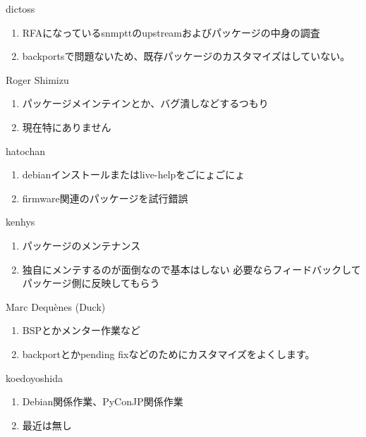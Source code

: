 \begin{prework}{ dictoss }
  \begin{enumerate}
  \item RFAになっているsnmpttのupstreamおよびパッケージの中身の調査
  \item backportsで問題ないため、既存パッケージのカスタマイズはしていない。
  \end{enumerate}
\end{prework}

\begin{prework}{ Roger Shimizu }
  \begin{enumerate}
  \item パッケージメインテインとか、バグ潰しなどするつもり
  \item 現在特にありません
  \end{enumerate}
\end{prework}

\begin{prework}{ hatochan }
  \begin{enumerate}
  \item debianインストールまたはlive-helpをごにょごにょ
  \item firmware関連のパッケージを試行錯誤
  \end{enumerate}
\end{prework}

\begin{prework}{ kenhys }
  \begin{enumerate}
  \item パッケージのメンテナンス
  \item 独自にメンテするのが面倒なので基本はしない 必要ならフィードバックしてパッケージ側に反映してもらう
  \end{enumerate}
\end{prework}

\begin{prework}{ Marc Dequènes (Duck) }
  \begin{enumerate}
  \item BSPとかメンター作業など
  \item backportとかpending fixなどのためにカスタマイズをよくします。
  \end{enumerate}
\end{prework}

\begin{prework}{ koedoyoshida }
  \begin{enumerate}
  \item Debian関係作業、PyConJP関係作業
  \item 最近は無し
  \end{enumerate}
\end{prework}

